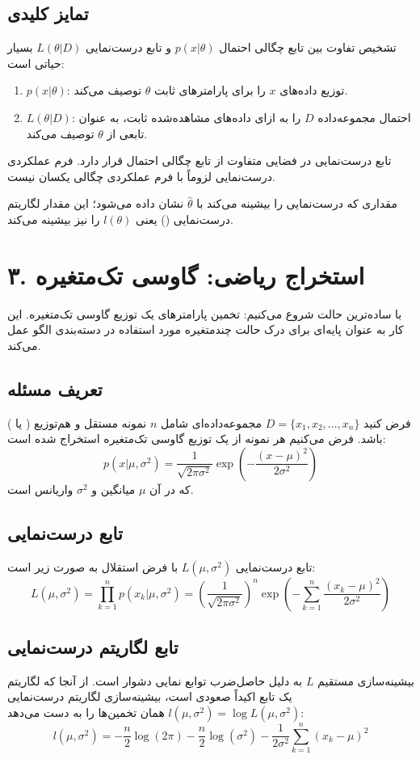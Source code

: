 \documentclass{article}
\begin{document}
\subsection*{تمایز کلیدی}
تشخیص تفاوت بین تابع چگالی احتمال $p(x|\theta)$ و تابع درست‌نمایی $L(\theta|D)$ بسیار حیاتی است:
\begin{enumerate}
    \item $p(x|\theta)$: توزیع داده‌های $x$ را برای پارامترهای ثابت $\theta$ توصیف می‌کند.
    \item $L(\theta|D)$: احتمال مجموعه‌داده $D$ را به ازای داده‌های مشاهده‌شده ثابت، به عنوان تابعی از $\theta$ توصیف می‌کند.
\end{enumerate}
تابع درست‌نمایی در فضایی متفاوت از تابع چگالی احتمال قرار دارد. فرم عملکردی درست‌نمایی لزوماً با فرم عملکردی چگالی یکسان نیست.

مقداری که درست‌نمایی را بیشینه می‌کند با $\hat{\theta}$ نشان داده می‌شود؛ این مقدار لگاریتم درست‌نمایی () یعنی $l(\theta)$ را نیز بیشینه می‌کند.

\section*{۳. استخراج ریاضی: گاوسی تک‌متغیره}
با ساده‌ترین حالت شروع می‌کنیم: تخمین پارامترهای یک توزیع گاوسی تک‌متغیره. این کار به عنوان پایه‌ای برای درک حالت چندمتغیره مورد استفاده در دسته‌بندی الگو عمل می‌کند.

\subsection*{تعریف مسئله}
فرض کنید $D = \{x_1, x_2, \dots, x_n\}$ مجموعه‌داده‌ای شامل $n$ نمونه مستقل و هم‌توزیع ( یا ) باشد. فرض می‌کنیم هر نمونه از یک توزیع گاوسی تک‌متغیره استخراج شده است:
\[
p(x|\mu, \sigma^2) = \frac{1}{\sqrt{2\pi\sigma^2}} \exp\left( -\frac{(x-\mu)^2}{2\sigma^2} \right)
\]
که در آن $\mu$ میانگین و $\sigma^2$ واریانس است.

\subsection*{تابع درست‌نمایی}
تابع درست‌نمایی $L(\mu, \sigma^2)$ با فرض استقلال به صورت زیر است:
\[
L(\mu, \sigma^2) = \prod_{k=1}^n p(x_k|\mu, \sigma^2) = \left( \frac{1}{\sqrt{2\pi\sigma^2}} \right)^n \exp\left( -\sum_{k=1}^n \frac{(x_k-\mu)^2}{2\sigma^2} \right)
\]

\subsection*{تابع لگاریتم درست‌نمایی}
بیشینه‌سازی مستقیم $L$ به دلیل حاصل‌ضرب توابع نمایی دشوار است. از آنجا که لگاریتم یک تابع اکیداً صعودی است، بیشینه‌سازی لگاریتم درست‌نمایی $l(\mu, \sigma^2) = \log L(\mu, \sigma^2)$ همان تخمین‌ها را به دست می‌دهد:
\[
l(\mu, \sigma^2) = -\frac{n}{2} \log(2\pi) - \frac{n}{2} \log(\sigma^2) - \frac{1}{2\sigma^2} \sum_{k=1}^n (x_k-\mu)^2
\]
\end{document}
